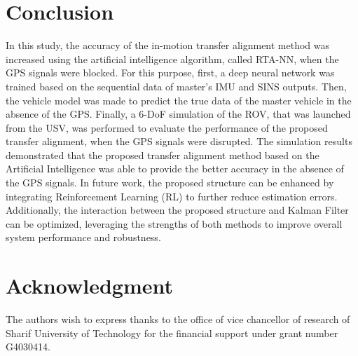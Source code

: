 \documentclass[3p]{elsarticle}
\begin{document}
\section{Conclusion}\label{sec:conclusion}
\noindent In this study, the accuracy of the in-motion transfer alignment method was increased using the artificial intelligence algorithm, called RTA-NN, when the GPS signals were blocked. For this purpose, first, a deep neural network
was trained based on the sequential data of master's IMU and SINS outputs. Then, the vehicle model was made to predict the true data of the master vehicle in the absence of the GPS\@.
Finally, a 6-DoF simulation of the ROV, that was launched from the USV, was performed to evaluate the performance of the proposed transfer alignment, when the GPS signals were disrupted.
The simulation results demonstrated that the proposed transfer alignment
method
based on the Artificial Intelligence
was able to provide the better accuracy in the absence of the GPS signals.
In future work, the proposed structure can be enhanced by integrating Reinforcement Learning (RL) to further reduce estimation errors. Additionally, the interaction between the proposed structure and Kalman Filter can be optimized, leveraging the strengths of both methods to improve overall system performance and robustness.

\section{Acknowledgment}
\noindent The authors wish to express thanks to the office of vice chancellor of research of Sharif University of Technology for the financial
support under grant number G4030414.







\end{document}
